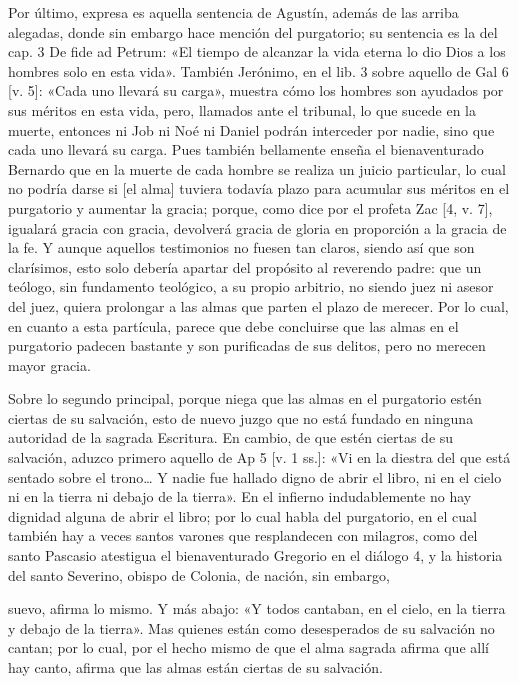 Por último, expresa es aquella sentencia de Agustín, además de las arriba alegadas, donde sin embargo hace mención del purgatorio; su sentencia es la del cap. 3 De fide ad Petrum: «El tiempo de alcanzar la vida eterna lo dio Dios a los hombres solo en esta vida». También Jerónimo, en el lib. 3 sobre aquello de Gal 6 [v. 5]: «Cada uno llevará su carga», muestra cómo los hombres son ayudados por sus méritos en esta vida, pero, llamados ante el tribunal, lo que sucede en la muerte, entonces ni Job ni Noé ni Daniel podrán interceder por nadie, sino que cada uno llevará su carga. Pues también bellamente enseña el bienaventurado Bernardo que en la muerte de cada hombre se realiza un juicio particular, lo cual no podría darse si [el alma] tuviera todavía plazo para acumular sus méritos en el purgatorio y aumentar la gracia; porque, como dice por el profeta Zac [4, v. 7], igualará gracia con gracia, devolverá gracia de gloria en proporción a la gracia de la fe. \marginpar{\small[328]} Y aunque aquellos testimonios no fuesen tan claros, siendo así que son clarísimos, esto solo debería apartar del propósito al reverendo padre: que un teólogo, sin fundamento teológico, a su propio arbitrio, no siendo juez ni asesor del juez, quiera prolongar a las almas que parten el plazo de merecer. Por lo cual, en cuanto a esta partícula, parece que debe concluirse que las almas en el purgatorio padecen bastante y son purificadas de sus delitos, pero no merecen mayor gracia.

Sobre lo segundo principal, porque niega que las almas en el purgatorio estén ciertas de su salvación, esto de nuevo juzgo que no está fundado en ninguna autoridad de la sagrada Escritura. En cambio, de que estén ciertas de su salvación, aduzco primero aquello de Ap 5 [v. 1 ss.]: «Vi en la diestra del que está sentado sobre el trono… Y nadie fue hallado digno de abrir el libro, ni en el cielo ni en la tierra ni debajo de la tierra». En el infierno indudablemente no hay dignidad alguna de abrir el libro; por lo cual habla del purgatorio, en el cual también hay a veces santos varones que resplandecen con milagros, como del santo Pascasio atestigua el bienaventurado Gregorio en el diálogo 4, y la historia del santo Severino, obispo de Colonia, de nación, sin embargo,

suevo, afirma lo mismo. Y más abajo: «Y todos cantaban, en el cielo, en la tierra y debajo de la tierra». Mas quienes están como desesperados de su salvación no cantan; por lo cual, por el hecho mismo de que el alma sagrada afirma que allí hay canto, afirma que las almas están ciertas de su salvación.

